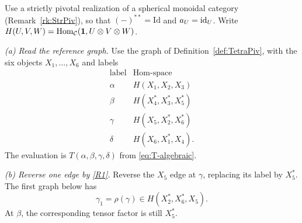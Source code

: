 \documentclass{amsart}
\begin{document}
\begin{example}\label{ex:tetra-dictionary}
Use a strictly pivotal realization of a spherical monoidal category (Remark~\ref{rk:StrPiv}), so that $(-)^{**}=\mathrm{Id}$ and $a_U=\mathrm{id}_U$. Write $H(U,V,W)=\mathrm{Hom}_{\mathcal{C}}({\bf 1},U\otimes V\otimes W)$.

\emph{(a) Read the reference graph.} Use the graph of Definition~\ref{def:TetraPiv}, with the six objects $X_1,\ldots,X_6$ and labels
\[
\begin{array}{c|c}
\text{label}&\text{Hom-space}\\\hline
\alpha&H(X_1,X_2,X_3)\\
\beta&H(X_4^*,X_3^*,X_5^*)\\
\gamma&H(X_5,X_2^*,X_6^*)\\
\delta&H(X_6,X_1^*,X_4).
\end{array}
\]
The evaluation is $T(\alpha,\beta,\gamma,\delta)$ from \eqref{eq:T-algebraic}.

\emph{(b) Reverse one edge by \eqref{R1}.} Reverse the $X_5$ edge at $\gamma$, replacing its label by $X_5^*$. The first graph below has
\[
 \gamma_1=\rho(\gamma)\in H(X_2^*,X_6^*,X_5).
\]
At $\beta$, the corresponding tensor factor is still $X_5^*$.


\end{example}
\end{document}
